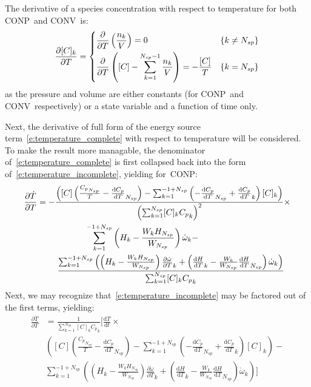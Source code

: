 \documentclass[12pt]{article}
\newcommand{\ns}{N_{sp}}
\newcommand{\conp}{CONP}
\newcommand{\conv}{CONV}
\begin{document}
The derivative of a species concentration with respect to temperature for both \conp~and \conv~is:
\begin{align}
 \frac{\partial [C]_{k}}{\partial T} = 
 \begin{dcases}
  \frac{\partial}{\partial T} \left(\frac{n_k}{V}\right) = 0 & \left\{k \ne \ns\right\} \\
  \frac{\partial}{\partial T} \left([C] - \sum_{k=1}^{\ns - 1}{\frac{n_k}{V}}\right) = -\frac{[C]}{T} & \left\{k = \ns\right\}
 \end{dcases}
\end{align}
as the pressure and volume are either constants (for \conp~and \conv~respectively) or a state variable and a function of time only.

Next, the derivative of full form of the energy source term~\cref{e:temperature_complete} with respect to temperature will be considered.
To make the result more managable, the denominator of~\cref{e:temperature_complete} is first collapsed back into the form of~\cref{e:temperature_incomplete}, yielding for~\conp:
\begin{align}
 \frac{\partial\dot{T}}{\partial{T}} &= - \frac{\left( [C] \left( \frac{{C_p}_{\ns}}{T} - \frac{\text{d} {C_p} }{\text{d} T }_{\ns} \right) - \sum_{k=1}^{-1 + \ns} \left(- \frac{\text{d} {C_p} }{\text{d} T }_{\ns} + \frac{\text{d} {C_p} }{\text{d} T }_{k}\right) [C]_{k}\right)}{\left(\sum_{k=1}^{\ns} [C]_{k} {C_p}_{k}\right)^{2}} \times \nonumber \\
				     & \mathindent[largerindent] \sum_{k=1}^{-1 + \ns} \left(H_{k} - \frac{W_{k} H_{\ns}}{W_{\ns}}\right) \dot{\omega}_{k} - \nonumber \\
				     & \mathindent \frac{\sum_{k=1}^{-1 + \ns} \left(\left(H_{k} - \frac{W_{k} H_{\ns}}{W_{\ns}}\right) \frac{\partial \dot{\omega} }{\partial T }_{k} + \left(\frac{\text{d} H }{\text{d} T }_{k} - \frac{W_{k}}{W_{\ns}} \frac{\text{d} H }{\text{d} T }_{\ns}\right) \dot{\omega}_{k}\right)}{\sum_{k=1}^{\ns} [C]_{k} {C_p}_{k}}
\end{align}
Next, we may recognize that~\cref{e:temperature_incomplete} may be factored out of the first terms, yielding:
\begin{align}
 \frac{\partial\dot{T}}{\partial{T}} &= \frac{1}{\sum_{k=1}^{\ns} [C]_{k} {C_p}_{k}} \Biggl[ \frac{\text{d} T }{\text{d} t } \times \nonumber \\
				     & \left( [C] \left( \frac{{C_p}_{\ns}}{T} - \frac{\text{d} {C_p} }{\text{d} T }_{\ns} \right) - \sum_{k=1}^{-1 + \ns} \left(- \frac{\text{d} {C_p} }{\text{d} T }_{\ns} + \frac{\text{d} {C_p} }{\text{d} T }_{k}\right) [C]_{k}\right) - \nonumber \\
				     & \sum_{k=1}^{-1 + \ns} \left(\left(H_{k} - \frac{W_{k} H_{\ns}}{W_{\ns}}\right) \frac{\partial \dot{\omega} }{\partial T }_{k} + \left(\frac{\text{d} H }{\text{d} T }_{k} - \frac{W_{k}}{W_{\ns}} \frac{\text{d} H }{\text{d} T }_{\ns}\right) \dot{\omega}_{k}\right) \Biggr]
\end{align}
\end{document}
